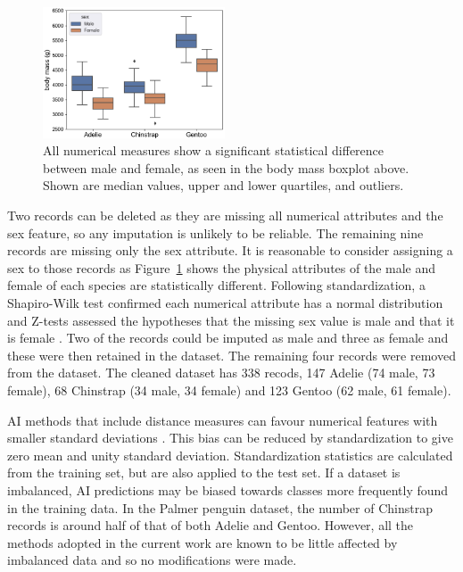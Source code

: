 \documentclass[12pt]{article}
\begin{document}
\begin{figure} %
  \centering
  \vspace{-0.5\baselineskip} %
  \includegraphics[width=0.48\textwidth]{sex.png} %
  \vspace{-0.5\baselineskip} %
  \caption{All numerical measures show a significant statistical difference between male and female, 
  as seen in the body mass boxplot above. Shown are median values, upper and lower quartiles, 
  and outliers.}
  \vspace{-0.5\baselineskip} %
  \label{fig:sex}
\end{figure}   

Two records can be deleted as they are missing all numerical attributes and the sex feature, so 
any imputation is unlikely to be reliable. 
The remaining nine records are missing only the sex attribute. It is reasonable to 
consider assigning a sex to those records
as Figure~\ref{fig:sex} shows the physical attributes of the male and female of each species 
are statistically different. Following standardization, 
a Shapiro-Wilk test confirmed each numerical attribute has a normal distribution \cite{shapiro1965analysis} 
and Z-tests assessed the 
hypotheses that the missing sex value is male and that it is female \cite{freedman2007statistics}. 
Two of the records could be imputed as male and three as female 
and these were then retained in the dataset. 
The remaining four records were removed from the dataset. 
The cleaned dataset has 338 recods, 147 Adelie  
(74 male, 73 female), 68 Chinstrap (34 male, 34 female) and 123 Gentoo  (62 male, 61 female).

AI methods that include distance measures can favour numerical features 
with smaller standard deviations \cite{hastie2009elements}. 
This bias can be reduced by standardization to give zero mean and unity standard deviation. 
Standardization statistics are calculated from the training set, but are also applied to the test set. 
If a dataset is imbalanced, 
AI predictions may be biased towards classes more frequently found in the training data. 
In the Palmer penguin dataset, the number of Chinstrap records is around half of that of both Adelie and Gentoo.
However, all the methods adopted in the current work are known to be little affected by 
imbalanced data \cite{he2009learning} and so no modifications were made.
\end{document}
